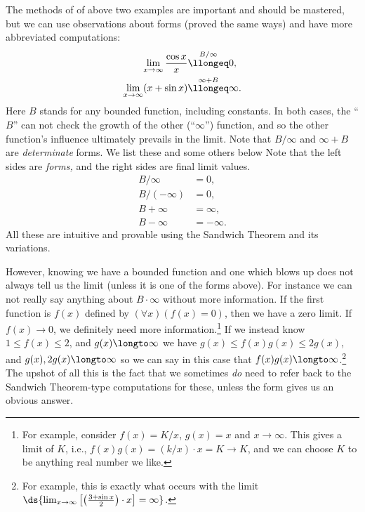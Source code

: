 The methods of of above two examples are important and should
be mastered, but we can use observations about forms (proved the
same ways) and have more abbreviated computations:
\begin{align*}
\lim_{x\to\infty}\frac{\cos x}{x}&\overset{B/\infty}{%
\llongeq}0,\\
\lim_{x\to\infty}(x+\sin x)&\overset{\infty+B}{\llongeq}\infty.
\end{align*}
Here $B$ stands for any bounded function, including constants.
In both cases, the ``$B$'' can not check the growth of the
other (``$\infty$'') function, and so the other function's
influence ultimately prevails in the limit.  Note that
$B/\infty$ and $\infty+B$ are {\it determinate} forms.
We list these and some others below  Note that the left sides
are {\it forms,} and the right sides are final limit values.
\begin{align}
B/\infty&=0,\label{B/Infinity=0}\\  
B/(-\infty)&=0,\label{B/(-Infinity)=0}\\
B+\infty&=\infty,\label{B+Infinity=Infinity}\\  
B-\infty&=-\infty\label{B-Infinity=-Infinity}.
\end{align}
All these are intuitive and
provable using the Sandwich Theorem and its variations.


However, knowing we have a bounded function
and one which blows up does not always tell us the limit
(unless it is one of the forms above).
For instance we can not really say anything about 
$B\cdot\infty$ without more 
information.  If the first function is $f(x)$ defined by 
$(\forall x)(f(x)=0)$, then we have a zero limit.  If $f(x)\to0$,
we definitely need more information.\footnote{%
For example, consider
$f(x)=K/x$, $g(x)=x$ and $x\to\infty$.  This gives a limit
of $K$, i.e., $f(x)g(x)=(k/x)\cdot x=K\longrightarrow K$,
and we can choose $K$ to be anything real number we like.
}
  If we instead know
$1\le f(x)\le 2$,
and $g(x)\longto\infty$ we have 
$g(x)\le f(x)g(x)\le 2g(x)$, and $g(x), 2g(x)\longto\infty$ so
we can say in this case that $f(x)g(x)\longto\infty$.\footnote{  
For example, this is exactly what occurs with the limit
$\ds{\lim_{x\to\infty}\left[\left(\frac{3+\sin x}2\right)\cdot
x\right]=\infty}$.}
The upshot of all
this is the fact that we sometimes {\it do} need to refer
back to the Sandwich Theorem-type computations for these, unless
the form gives us an obvious answer.


